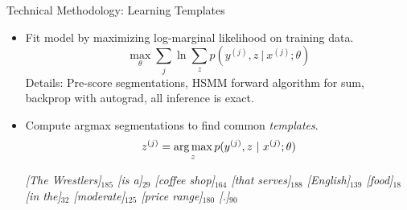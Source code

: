 \begin{frame}{Technical Methodology:  Learning Templates}

  \begin{itemize}
  \item Fit model by maximizing log-marginal likelihood on training data.
    \[ \max_\theta \sum_{j} \ln \sum_z p(y^{(j)}, z \ |\ x^{(j)}; \theta)\]
    \air
  Details: Pre-score segmentations, HSMM forward algorithm for sum, backprop with autograd, all inference is exact.
    \air

    \pause

  \item Compute argmax segmentations to find common \textit{templates}.
    \[ z^{(j)} = \argmax_z p(y^{(j)}, z \ |\ x^{(j)}; \theta)\]


    {\it
    [The Wrestlers]$_{185}$ [is a]$_{29}$ [coffee shop]$_{164}$ [that serves]$_{188}$ [English]$_{139}$ [food]$_{18}$ [in the]$_{32}$ [moderate]$_{125}$ [price range]$_{180}$ [.]$_{90}$
  }
  \end{itemize}

\end{frame}


